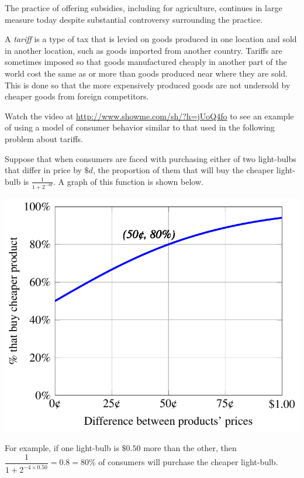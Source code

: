\documentclass{ximera}
\begin{document}
The practice of offering subsidies, including for agriculture, continues in large measure today despite substantial controversy surrounding the practice.

A \emph{tariff} is a type of tax that is levied on goods produced in one location and sold in another location, such as goods imported from another country. Tariffs are sometimes imposed so that goods manufactured cheaply in another part of the world cost the same as or more than goods produced near where they are sold. This is done so that the more expensively produced goods are not undersold by cheaper goods from foreign competitors.

\begin{question}
Watch the video at \href{http://www.showme.com/sh/?h=jUoQ4fo}{http://www.showme.com/sh/?h=jUoQ4fo} to see an example of using a model of consumer behavior similar to that used in the following problem about tariffs.

Suppose that when consumers are faced with purchasing either of two light-bulbs that differ in price by $\$d$, the proportion of them that will buy the cheaper light-bulb is $\displaystyle \frac{1}{1+2^{-4d}}$. A graph of this function is shown below.
\begin{image}
\includegraphics{buyingproducts.pdf}
\end{image}
For example, if one light-bulb is $\$0.50$ more than the other, then $\dfrac{1}{1+2^{-4\times 0.50}}=0.8=80\%$ of consumers will purchase the cheaper light-bulb.


\end{question}
\end{document}
